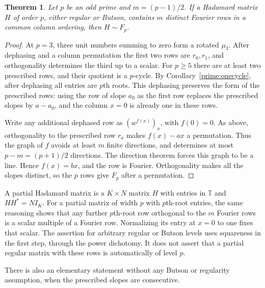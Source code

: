 \documentclass[11pt,a4paper]{article}
\newtheorem{theorem}{Theorem}[section]
\numberwithin{equation}{section}
\begin{document}
\begin{theorem}\label{prime:fourierrows}
Let $p$ be an odd prime and $m=(p-1)/2$. If a Hadamard matrix $H$ of order $p$, either regular or Butson, contains $m$ distinct Fourier rows in a common column ordering, then $H\sim F_p$.
\end{theorem}
\begin{proof}
At $p=3$, three unit numbers summing to zero form a rotated $\mu_3$. After dephasing and a column permutation the first two rows are $r_0,r_1$, and orthogonality determines the third up to a scalar. For $p\ge5$ there are at least two prescribed rows, and their quotient is a $p$-cycle. By Corollary~\ref{prime:onecycle}, after dephasing all entries are $p$th roots. This dephasing preserves the form of the prescribed rows: using the row of slope $a_0$ as the first row replaces the prescribed slopes by $a-a_0$, and the column $x=0$ is already one in these rows.

Write any additional dephased row as $(w^{f(x)})_x$, with $f(0)=0$. As above, orthogonality to the prescribed row $r_a$ makes $f(x)-ax$ a permutation. Thus the graph of $f$ avoids at least $m$ finite directions, and determines at most $p-m=(p+1)/2$ directions. The direction theorem forces this graph to be a line. Hence $f(x)=bx$, and the row is Fourier. Orthogonality makes all the slopes distinct, so the $p$ rows give $F_p$ after a permutation.
\end{proof}

A partial Hadamard matrix is a $K\times N$ matrix $H$ with entries in $\mathbb T$ and $HH^*=NI_K$. For a partial matrix of width $p$ with $p$th-root entries, the same reasoning shows that any further $p$th-root row orthogonal to the $m$ Fourier rows is a scalar multiple of a Fourier row. Normalizing its entry at $x=0$ to one fixes that scalar. The assertion for arbitrary regular or Butson levels uses squareness in the first step, through the power dichotomy. It does not assert that a partial regular matrix with these rows is automatically of level $p$.

There is also an elementary statement without any Butson or regularity assumption, when the prescribed slopes are consecutive.
\end{document}
